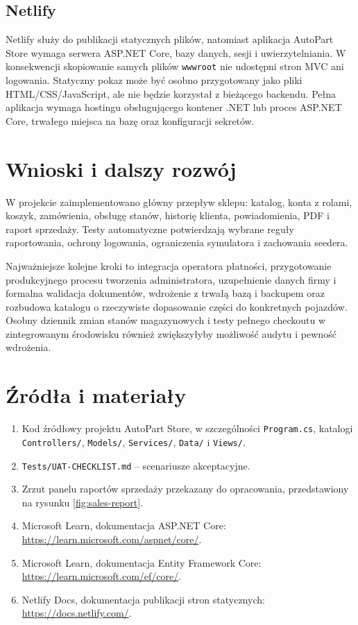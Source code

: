 \documentclass[12pt,a4paper]{article}
\begin{document}
\subsection{Netlify}
Netlify służy do publikacji statycznych plików, natomiast aplikacja AutoPart
Store wymaga serwera ASP.NET Core, bazy danych, sesji i uwierzytelniania.
W konsekwencji skopiowanie samych plików \texttt{wwwroot} nie udostępni
stron MVC ani logowania. Statyczny pokaz może być osobno przygotowany jako
pliki HTML/CSS/JavaScript, ale nie będzie korzystał z bieżącego backendu.
Pełna aplikacja wymaga hostingu obsługującego kontener .NET lub proces ASP.NET
Core, trwałego miejsca na bazę oraz konfiguracji sekretów.

\section{Wnioski i dalszy rozwój}
W projekcie zaimplementowano główny przepływ sklepu: katalog, konta z rolami,
koszyk, zamówienia, obsługę stanów, historię klienta, powiadomienia, PDF
i raport sprzedaży. Testy automatyczne potwierdzają wybrane reguły raportowania,
ochrony logowania, ograniczenia symulatora i zachowania seedera.

Najważniejsze kolejne kroki to integracja operatora płatności, przygotowanie
produkcyjnego procesu tworzenia administratora, uzupełnienie danych firmy
i formalna walidacja dokumentów, wdrożenie z trwałą bazą i backupem oraz
rozbudowa katalogu o rzeczywiste dopasowanie części do konkretnych pojazdów.
Osobny dziennik zmian stanów magazynowych i testy pełnego checkoutu w
zintegrowanym środowisku również zwiększyłyby możliwość audytu i pewność
wdrożenia.

\section*{Źródła i materiały}
\begin{enumerate}[leftmargin=*]
    \item Kod źródłowy projektu AutoPart Store, w szczególności
    \texttt{Program.cs}, katalogi \texttt{Controllers/}, \texttt{Models/},
    \texttt{Services/}, \texttt{Data/} i \texttt{Views/}.
    \item \texttt{Tests/UAT-CHECKLIST.md} -- scenariusze akceptacyjne.
    \item Zrzut panelu raportów sprzedaży przekazany do opracowania,
    przedstawiony na rysunku \ref{fig:sales-report}.
    \item Microsoft Learn, dokumentacja ASP.NET Core:
    \url{https://learn.microsoft.com/aspnet/core/}.
    \item Microsoft Learn, dokumentacja Entity Framework Core:
    \url{https://learn.microsoft.com/ef/core/}.
    \item Netlify Docs, dokumentacja publikacji stron statycznych:
    \url{https://docs.netlify.com/}.
\end{enumerate}
\end{document}
